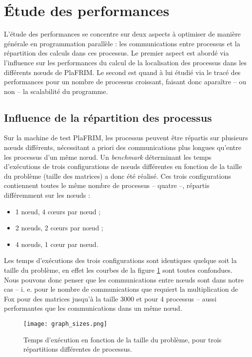 \section{\'Etude des performances}

L'étude des performances se concentre sur deux aspects à optimiser de manière générale en programmation parallèle : les communications entre processus et la répartition des calculs dans ces processus. Le premier aspect est abordé via l'influence sur les performances du calcul de la localisation des processus dans les différents n\oe uds de PlaFRIM. Le second est quand à lui étudié via le tracé des performances pour un nombre de processus croissant, faisant donc aparaître -- ou non -- la scalabilité du programme.

\subsection{Influence de la répartition des processus}

Sur la machine de test PlaFRIM, les processus peuvent être répartis sur plusieurs n\oe uds différents, nécessitant a priori des communications plus longues qu'entre les processus d'un même n\oe ud. Un \emph{benchmark} déterminant les temps d'exécutions de trois configurations de n\oe uds différentes en fonction de la taille du problème (taille des matrices) a donc été réalisé. Ces trois configurations contiennent toutes le même nombre de processus -- quatre --, répartis différemment sur les n\oe uds :
\begin{itemize}
\item 1 n\oe ud, 4 c\oe urs par n\oe ud ;
\item 2 n\oe uds, 2 c\oe urs par n\oe ud ;
\item 4 n\oe uds, 1 c\oe ur par n\oe ud.
\end{itemize}
Les temps d'exécutions des trois configurations sont identiques quelque soit la taille du problème, en effet les courbes de la figure \ref{graph:sizes} sont toutes confondues. Nous pouvons donc penser que les communications entre n\oe uds sont dans notre cas -- i. e. pour le nombre de communications que requiert la multiplication de Fox pour des matrices jusqu'à la taille $3000$ et pour $4$ processus -- aussi performantes que les communications dans un même n\oe ud.

\begin{figure}
\begin{center}
\texttt{[image: graph\_sizes.png]}
\caption{Temps d'exécution en fonction de la taille du problème, pour trois répartitions différentes de processus.}
\label{graph:sizes}
\end{center}
\end{figure}

